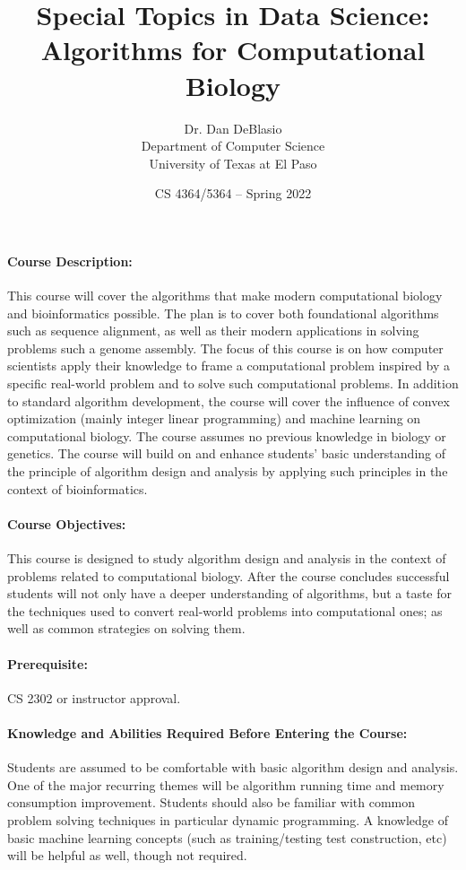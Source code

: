 \documentclass[12pt]{scrartcl}
\title{\large Special Topics in Data Science: \\
\LARGE Algorithms for Computational  Biology}\let\Title\@title
\subtitle{
{\small
\vskip0.5cm
Dr. Dan DeBlasio\\
Department of Computer Science \\
University of Texas at El Paso}
\vskip-1cm}
\date{\small CS 4364/5364 -- Spring 2022}
\begin{document}

\maketitle


\paragraph{Course Description:} 
This course will cover the algorithms that make modern computational biology and bioinformatics possible. 
The plan is to cover both foundational algorithms such as sequence alignment, 
as well as their modern applications in solving problems such a genome assembly. 
The focus of this course is on how computer scientists apply their knowledge to frame a computational problem inspired by a specific real-world problem 
and to solve such computational problems. 
In addition to standard algorithm development, 
the course will cover the influence of convex optimization (mainly integer linear programming) and machine learning on computational biology. 
The course assumes no previous knowledge in biology or genetics. 
The course will build on and enhance students’ basic understanding of the principle of algorithm design and analysis by applying such principles in the context of bioinformatics.


\paragraph{Course Objectives:} This course is designed to study algorithm design and analysis in the context of problems related to computational biology. 
After the course concludes successful students will not only have a deeper understanding of algorithms, but a taste for the techniques used to convert real-world problems into computational ones;
as well as common strategies on solving them. 


\paragraph{Prerequisite:} CS 2302 or instructor approval. 

\paragraph{Knowledge and Abilities Required Before Entering the Course:} Students are assumed to be comfortable with basic algorithm design and analysis. 
One of the major recurring themes will be algorithm running time and memory consumption improvement. 
Students should also be familiar with common problem solving techniques in particular dynamic programming.
A knowledge of basic machine learning concepts (such as training/testing test construction, etc) will be helpful as well, though not required. 
\end{document}
